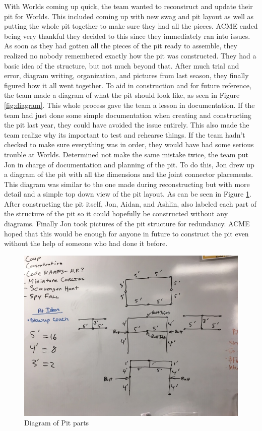 \documentclass{article}
\begin{document}
With Worlds coming up quick, the team wanted to reconstruct and update their pit for Worlds. This included coming up with new swag and pit layout as well as putting the whole pit together to make sure they had all the pieces. ACME ended being very thankful they decided to this since they immediately ran into issues. As soon as they had gotten all the pieces of the pit ready to assemble, they realized no nobody remembered exactly how the pit was constructed. They had a basic idea of the structure, but not much beyond that. After much trial and error, diagram writing, organization, and pictures from last season, they finally figured how it all went together. To aid in construction and for future reference, the team made a diagram of what the pit should look like, as seen in Figure \ref{fig:diagram}. This whole process gave the team a lesson in documentation. If the team had just done some simple documentation when creating and constructing the pit last year, they could have avoided the issue entirely. This also made the team realize why its important to test and rehearse things. If the team hadn't checked to make sure everything was in order, they would have had some serious trouble at Worlds. Determined not make the same mistake twice, the team put Jon in charge of documentation and planning of the pit. To do this, Jon drew up a diagram of the pit with all the dimensions and the joint connector placements. This diagram was similar to the one made during reconstructing but with more detail and a simple top down view of the pit layout. As can be seen in Figure \ref{fig:pitone}. After constructing the pit itself, Jon, Aidan, and Ashlin, also labeled each part of the structure of the pit so it could hopefully be constructed without any diagrams. Finally Jon took pictures of the pit structure for redundancy. ACME hoped that this would be enough for anyone in future to construct the pit even without the help of someone who had done it before.

\begin{figure}
    \centering
    \includegraphics[width= 0.5 \textwidth]{30_03-25/images/pitdiagram1.JPG}
    \caption{Diagram of Pit parts}
    \label{fig:pitone}
\end{figure}
\end{document}
